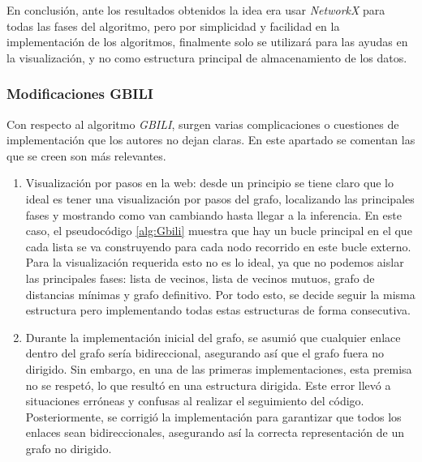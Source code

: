 En conclusión, ante los resultados obtenidos la idea era usar \textit{NetworkX} para todas las fases del algoritmo, pero por simplicidad y facilidad en la implementación de los algoritmos, finalmente solo se utilizará para las ayudas en la visualización, y no como estructura principal de almacenamiento de los datos.

\subsubsection{Modificaciones GBILI}\label{sec5:gbili}
Con respecto al algoritmo \textit{GBILI}, surgen varias complicaciones o cuestiones de implementación que los autores no dejan claras. En este apartado se comentan las que se creen son más relevantes.
\begin{enumerate}
	\item Visualización por pasos en la web: desde un principio se tiene claro que lo ideal es tener una visualización por pasos del grafo, localizando las principales fases y mostrando como van cambiando hasta llegar a la inferencia. En este caso, el pseudocódigo \ref{alg:Gbili} muestra que hay un bucle principal en el que cada lista se va construyendo para cada nodo recorrido en este bucle externo. Para la visualización requerida esto no es lo ideal, ya que no podemos aislar las principales fases: lista de vecinos, lista de vecinos mutuos, grafo de distancias mínimas y grafo definitivo. Por todo esto, se decide seguir la misma estructura pero implementando todas estas estructuras de forma consecutiva.
	\item Durante la implementación inicial del grafo, se asumió que cualquier enlace dentro del grafo sería bidireccional, asegurando así que el grafo fuera no dirigido. Sin embargo, en una de las primeras implementaciones, esta premisa no se respetó, lo que resultó en una estructura dirigida. Este error llevó a situaciones erróneas y confusas al realizar el seguimiento del código. Posteriormente, se corrigió la implementación para garantizar que todos los enlaces sean bidireccionales, asegurando así la correcta representación de un grafo no dirigido.

\end{enumerate}
